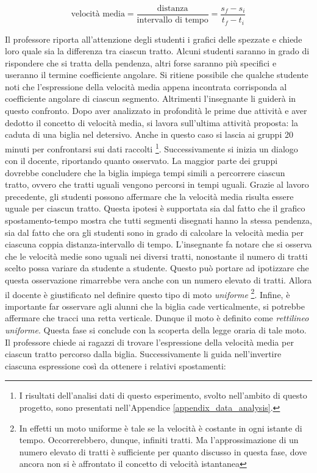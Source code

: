 \documentclass{report} \usepackage[T1]{fontenc} \usepackage[italian]{babel}
\begin{document}
\begin{equation}
\textrm{velocità media} = \frac{\textrm{distanza}}{\textrm{intervallo di tempo}} =
\frac{s_f - s_i}{t_f - t_i}
\end{equation}

Il professore riporta all’attenzione degli studenti i grafici delle spezzate e
chiede loro quale sia la differenza tra ciascun tratto. Alcuni studenti saranno
in grado di rispondere che si tratta della pendenza, altri forse saranno più
specifici e useranno il termine coefficiente angolare. Si ritiene possibile che
qualche studente noti che l’espressione della velocità media appena incontrata
corrisponda al coefficiente angolare di ciascun segmento. Altrimenti
l’insegnante li guiderà in questo confronto.
Dopo aver analizzato in profondità le prime due attività e aver dedotto il
concetto di velocità media, si lavora sull’ultima attività proposta: la caduta
di una biglia nel detersivo. Anche in questo caso si lascia ai gruppi 20 minuti
per confrontarsi sui dati raccolti
\footnote{
          I risultati dell'analisi dati di questo esperimento, svolto
          nell'ambito di questo progetto, sono presentati nell'Appendice
          \ref{appendix_data_analysis}.
         }.
Successivamente si
inizia un dialogo con il docente, riportando quanto osservato. La maggior parte
dei gruppi dovrebbe concludere che la biglia impiega tempi simili a percorrere
ciascun tratto, ovvero che tratti uguali vengono percorsi in tempi uguali.
Grazie al lavoro precedente, gli studenti possono affermare che la velocità
media risulta essere uguale per ciascun tratto. Questa ipotesi è supportata sia
dal fatto che il grafico spostamento-tempo mostra che tutti segmenti disegnati
hanno la stessa pendenza,
sia dal fatto che ora gli studenti sono in grado di calcolare la velocità
media per ciascuna coppia distanza-intervallo di tempo.
L’insegnante fa notare che si osserva che le velocità medie sono uguali nei
diversi tratti, nonostante il numero di tratti scelto possa variare da studente
a studente. Questo può portare ad ipotizzare che questa osservazione rimarrebbe
vera anche con un numero elevato di tratti. Allora il docente è giustificato
nel definire questo tipo di moto \emph{uniforme}
\footnote{
          In effetti un moto uniforme è
          tale se la velocità è costante in ogni istante di tempo. Occorrerebbero,
          dunque, infiniti tratti. Ma l’approssimazione di un numero elevato di tratti è
          sufficiente per quanto discusso in questa fase, dove ancora non si è affrontato
          il concetto di velocità istantanea
         }.
Infine, è importante far osservare agli
alunni che la biglia cade verticalmente, si potrebbe affermare che tracci una
retta verticale. Dunque il moto è definito come \emph{rettilineo uniforme}. Questa
fase si conclude con la scoperta della legge oraria di tale moto. Il professore
chiede ai ragazzi di trovare l’espressione della velocità media per ciascun
tratto percorso dalla biglia. Successivamente li guida nell’invertire ciascuna
espressione così da ottenere i relativi spostamenti:
\end{document}
